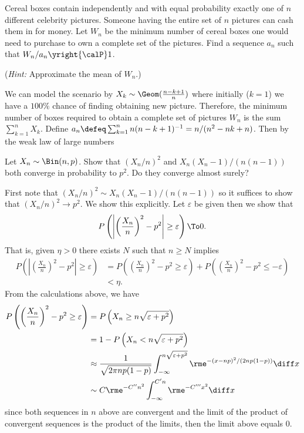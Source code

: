 \begin{problem}
  Cereal boxes contain independently and with equal probability exactly one
  of \(n\) different celebrity pictures. Someone having the entire set of
  \(n\) pictures can cash them in for money. Let \(W_n\) be the minimum
  number of cereal boxes one would need to purchase to own a complete set
  of the pictures. Find a sequence \(a_n\) such that
  \(W_n/a_n\yright{\calP} 1\).

  \noindent (\emph{Hint:} Approximate the mean of \(W_n\).)
\end{problem}
\begin{solution}
  We can model the scenario by \(X_k\sim\Geom(\frac{n-k+1}{n})\) where
  initially (\(k=1\)) we have a \(100\%\) chance of finding obtaining new
  picture. Therefore, the minimum number of boxes required to obtain a
  complete set of pictures \(W_n\) is the sum \(\sum_{k=1}^n X_k\). Define
  \(a_n\defeq \sum_{k=1}^nn(n-k+1)^{-1}=n/(n^2-nk+n)\). Then by the weak
  law of large numbers
\end{solution}
\newpage

\begin{problem}[DasGupta 7.17]
  Let \(X_n\sim\Bin(n,p)\). Show that \((X_n/n)^2\) and
  \(X_n(X_n-1)/(n(n-1))\) both converge in probability to \(p^2\). Do
  they converge almost surely?
\end{problem}
\begin{solution}
  First note that \((X_n/n)^2\sim X_n(X_n-1)/(n(n-1))\) so it suffices to
  show that \((X_n/n)^2\to p^2\). We show this explicitly. Let
  \(\varepsilon\) be given then we show that
  \[
    P\left(\left|\left(\frac{X_n}{n}\right)^2
        -p^2\right|\geq\varepsilon\right)\To 0.
  \]
  That is, given \(\eta>0\) there exists \(N\) such that \(n\geq N\)
  implies
  \begin{align*}
    P\left(\left|\left(\frac{X_n}{n}\right)^2
        -p^2\right|\geq\varepsilon\right)
    &=P\left(\left(\frac{X_n}{n}\right)^2
      -p^2\geq\varepsilon\right)
      +P\left(\left(\frac{X_n}{n}\right)^2
      -p^2\leq-\varepsilon\right)\\
    &<\eta.
  \end{align*}
  From the calculations above, we have
  \begin{align*}
    P\left(\left(\frac{X_n}{n}\right)^2
    -p^2\geq\varepsilon\right)
    &=P\left(X_n\geq n\sqrt{\varepsilon+p^2}\right)\\
    &=1-P\left(X_n<n\sqrt{\varepsilon+p^2}\right)\\
    &\approx\frac{1}{\sqrt{2\pi n p(1-p)}}\int_{-\infty}^{n\sqrt{\varepsilon+p^2}}
      \rme^{-(x-np)^2/(2np(1-p))}\diff x
    \\
    &\sim C\rme^{-C''n^2}\int_{-\infty}^{C'n}\rme^{-C'''x^2}\diff x
  \end{align*}
  since both sequences in \(n\) above are convergent and the limit of the
  product of convergent sequences is the product of the limits, then the
  limit above equals \(0\).
\end{solution}
\newpage

